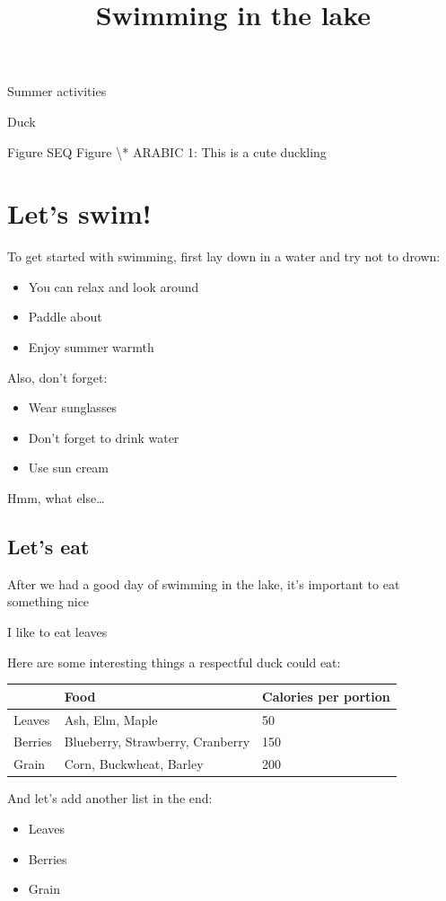 \documentclass[11pt,a4paper]{article}
\title{Swimming in the lake}
\begin{document}
\maketitle

Summer activities

Duck

\begin{figure}[h]
\end{figure}

Figure  SEQ Figure \textbackslash{}* ARABIC 1: This is a cute duckling

\section{Let’s swim!}

To get started with swimming, first lay down in a water and try not to drown:

\begin{itemize}
\item You can relax and look around
\item Paddle about
\item Enjoy summer warmth
\end{itemize}

Also, don’t forget:

\begin{itemize}
\item Wear sunglasses
\item Don’t forget to drink water
\item Use sun cream
\end{itemize}

Hmm, what else…

\subsection{Let’s eat}

After we had a good day of swimming in the lake, it’s important to eat something nice

I like to eat leaves

Here are some interesting things a respectful duck could eat:

\begin{table}[h]
\begin{tabular}{|l|l|l|}
\hline
 & Food & Calories per portion \\ \hline
Leaves & Ash, Elm, Maple & 50 \\ \hline
Berries & Blueberry, Strawberry, Cranberry & 150 \\ \hline
Grain & Corn, Buckwheat, Barley & 200 \\ \hline
\end{tabular}
\end{table}

And let’s add another list in the end:

\begin{itemize}
\item Leaves
\item Berries
\item Grain
\end{itemize}
\end{document}
